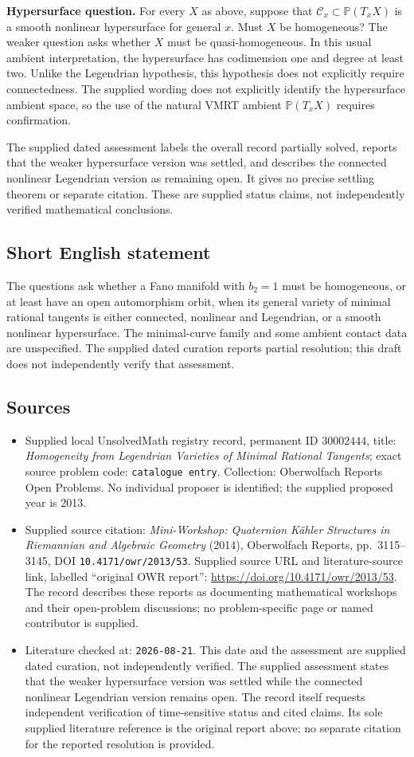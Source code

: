 \documentclass[11pt]{article}
\newcommand{\PP}{\mathbb{P}}
\begin{document}
\textbf{Hypersurface question.} For every \(X\) as above, suppose that \(\mathcal C_x\subset\PP(T_xX)\) is a smooth nonlinear hypersurface for general \(x\). Must \(X\) be homogeneous? The weaker question asks whether \(X\) must be quasi-homogeneous. In this usual ambient interpretation, the hypersurface has codimension one and degree at least two. Unlike the Legendrian hypothesis, this hypothesis does not explicitly require connectedness. The supplied wording does not explicitly identify the hypersurface ambient space, so the use of the natural VMRT ambient \(\PP(T_xX)\) requires confirmation.

The supplied dated assessment labels the overall record partially solved, reports that the weaker hypersurface version was settled, and describes the connected nonlinear Legendrian version as remaining open. It gives no precise settling theorem or separate citation. These are supplied status claims, not independently verified mathematical conclusions.
\subsection{Short English statement}
The questions ask whether a Fano manifold with \(b_2=1\) must be homogeneous, or at least have an open automorphism orbit, when its general variety of minimal rational tangents is either connected, nonlinear and Legendrian, or a smooth nonlinear hypersurface. The minimal-curve family and some ambient contact data are unspecified. The supplied dated curation reports partial resolution; this draft does not independently verify that assessment.
\subsection{Sources}
\begin{itemize}
\item Supplied local UnsolvedMath registry record, permanent ID \(30002444\), title: \emph{Homogeneity from Legendrian Varieties of Minimal Rational Tangents}; exact source problem code: \texttt{catalogue entry}. Collection: Oberwolfach Reports Open Problems. No individual proposer is identified; the supplied proposed year is 2013.
\item Supplied source citation: \emph{Mini-Workshop: Quaternion K\"ahler Structures in Riemannian and Algebraic Geometry} (2014), Oberwolfach Reports, pp.~3115--3145, DOI \texttt{10.4171/owr/2013/53}. Supplied source URL and literature-source link, labelled ``original OWR report'': \url{https://doi.org/10.4171/owr/2013/53}. The record describes these reports as documenting mathematical workshops and their open-problem discussions; no problem-specific page or named contributor is supplied.
\item Literature checked at: \texttt{2026-08-21}. This date and the assessment are supplied dated curation, not independently verified. The supplied assessment states that the weaker hypersurface version was settled while the connected nonlinear Legendrian version remains open. The record itself requests independent verification of time-sensitive status and cited claims. Its sole supplied literature reference is the original report above; no separate citation for the reported resolution is provided.
\end{itemize}
\end{document}
